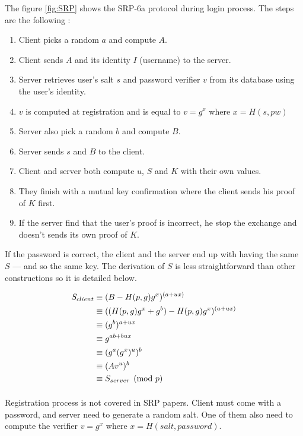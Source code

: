 \documentclass[../report.tex]{subfiles}
\begin{document}
The figure \ref{fig:SRP} shows the SRP-6a protocol during login process.
The steps are the following :

\begin{enumerate}
 \item Client picks a random $a$ and compute $A$.
 \item Client sends $A$ and its identity $I$ (username) to the server.
 \item Server retrieves user's salt $s$ and password verifier $v$ from its database using the user's identity.
 \item $v$ is computed at registration and is equal to $v = g^x$ where $x = H(s, pw)$
 \item Server also pick a random $b$ and compute $B$.
 \item Server sends $s$ and $B$ to the client.
 \item Client and server both compute $u$, $S$ and $K$ with their own values.
 \item They finish with a mutual key confirmation where the client sends his proof of $K$ first.
 \item If the server find that the user's proof is incorrect, he stop the exchange and doesn't sends its own proof of $K$.
\end{enumerate}

If the password is correct, the client and the server end up with having the same $S$ --- and so the same key. The derivation of $S$ is less straightforward than other constructions so it is detailed below.

\begin{align*}
 S_{client}
 &\equiv (B - H(p, g) g^x)^{(a+ux)}\notag\\
 &\equiv ((H(p, g) g^x + g^b) - H(p, g) g^x)^{(a+ux)}\notag\\
 &\equiv (g^b)^{a+ux}\notag\\
 &\equiv g^{ab+bux}\notag\\
 &\equiv (g^a (g^x)^u)^b\notag\\
 &\equiv (Av^u)^b\notag\\
 &\equiv S_{server} \pmod{p}
\end{align*}

\paragraph{}
Registration process is not covered in SRP papers.
Client must come with a password, and server need to generate a random salt. One of them also need to compute the verifier $v = g^x$ where $x = H(salt, password)$.
\end{document}
